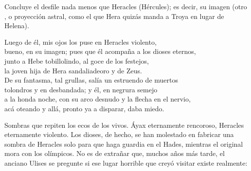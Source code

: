 Concluye el desfile nada menos que Heracles (Hércules); es decir, su imagen (otro , o proyección astral, como el que Hera quizás manda a Troya en lugar de Helena).

\begin{versocita}
Luego de él, mis ojos los puse en Heracles violento,\\
bueno, en su imagen; pues que él acompaña a los dioses eternos,\\
junto a Hebe tobillolindo, al goce de los festejos,\\
la joven hija de Hera sandaliadeoro y de Zeus.\\
De su fantasma, tal grullas, salía un estruendo de muertos\\
tolondros y en desbandada; y él, en negrura semejo\\
a la honda noche, con su arco desnudo y la flecha en el nervio,\\
acá oteando y allá, pronto ya a disparar, daba miedo.
\end{versocita}

Sombras que repiten los ecos de los vivos. Áyax eternamente rencoroso, Heracles eternamente violento. Los dioses, de hecho, se han molestado en fabricar una sombra de Heracles solo para que haga guardia en el Hades, mientras el original mora con los olímpicos. No es de extrañar que, muchos años más tarde, el anciano Ulises se pregunte si ese lugar horrible que creyó visitar existe realmente:

